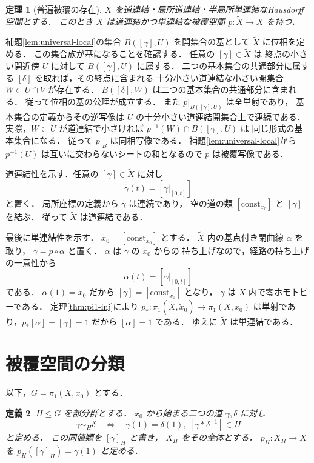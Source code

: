 \documentclass[a5paper,10pt,onecolumn]{jsarticle}
\makeatletter
\theoremstyle{mathnotetheorem}
\newtheorem{theorem}{定理}[section]
\newtheorem{definition}[theorem]{定義}
\renewcommand{\proofname}{証明}
\renewenvironment{proof}[1][\proofname]{%
  \par\pushQED{\qed}\normalfont\topsep4\p@\@plus2\p@\relax
  \trivlist\item[\hskip\labelsep\bfseries #1]\ignorespaces
}{\popQED\endtrivlist\@endpefalse}
\makeatother
\begin{document}
\begin{theorem}[普遍被覆の存在]\label{thm:universal-cover}
$X$ を道連結・局所道連結・半局所単連結なHausdorff空間とする．
このとき $X$ は道連結かつ単連結な被覆空間
$p:\widetilde X\to X$ を持つ．
\end{theorem}
\begin{proof}
補題\ref{lem:universal-local}の集合
$B([\gamma],U)$ を開集合の基として
$\widetilde X$ に位相を定める．
この集合族が基になることを確認する．
任意の $[\gamma]\in\widetilde X$ は
終点の小さい開近傍 $U$ に対して
$B([\gamma],U)$ に属する．
二つの基本集合の共通部分に属する
$[\delta]$ を取れば，その終点に含まれる
十分小さい道連結な小さい開集合
$W\subset U\cap V$ が存在する．
$B([\delta],W)$ は二つの基本集合の共通部分に含まれる．
従って位相の基の公理が成立する．
また $p|_{B([\gamma],U)}$ は全単射であり，
基本集合の定義からその逆写像は
$U$ の十分小さい道連結開集合上で連続である．
実際，$W\subset U$ が道連結で小さければ
$p^{-1}(W)\cap B([\gamma],U)$ は
同じ形式の基本集合になる．
従って $p|_B$ は同相写像である．
補題\ref{lem:universal-local}から
$p^{-1}(U)$ は互いに交わらないシートの和となるので
$p$ は被覆写像である．

道連結性を示す．任意の $[\gamma]\in\widetilde X$ に対し
\[
 \widetilde\gamma(t)=
 [\gamma|_{[0,t]}]
\]
と置く．
局所座標の定義から $\widetilde\gamma$ は連続であり，
空の道の類 $[\mathrm{const}_{x_0}]$ と
$[\gamma]$ を結ぶ．
従って $\widetilde X$ は道連結である．

最後に単連結性を示す．
$\widetilde x_0=[\mathrm{const}_{x_0}]$ とする．
$\widetilde X$ 内の基点付き閉曲線 $\alpha$ を取り，
$\gamma=p\circ\alpha$ と置く．
$\alpha$ は $\gamma$ の $\widetilde x_0$ からの
持ち上げなので，経路の持ち上げの一意性から
\[
 \alpha(t)=[\gamma|_{[0,t]}]
\]
である．
$\alpha(1)=\widetilde x_0$ だから
$[\gamma]=[\mathrm{const}_{x_0}]$ となり，
$\gamma$ は $X$ 内で零ホモトピーである．
定理\ref{thm:pi1-inj}により
$p_*:\pi_1(\widetilde X,\widetilde x_0)\to\pi_1(X,x_0)$
は単射であり，$p_*[\alpha]=[\gamma]=1$ だから
$[\alpha]=1$ である．
ゆえに $\widetilde X$ は単連結である．
\end{proof}

\section{被覆空間の分類}

以下，$G=\pi_1(X,x_0)$ とする．

\begin{definition}
$H\le G$ を部分群とする．
$x_0$ から始まる二つの道 $\gamma,\delta$ に対し
\[
 \gamma\sim_H\delta
 \quad\Longleftrightarrow\quad
 \gamma(1)=\delta(1),\
 [\gamma*\delta^{-1}]\in H
\]
と定める．
この同値類を $[\gamma]_H$ と書き，
$X_H$ をその全体とする．
$p_H:X_H\to X$ を
$p_H([\gamma]_H)=\gamma(1)$ と定める．
\end{definition}
\end{document}
